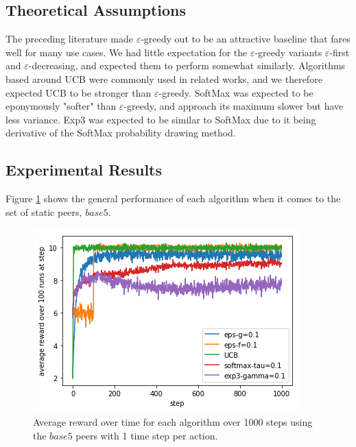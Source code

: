\documentclass{article}
\begin{document}
\subsection{Theoretical Assumptions} 
The preceding literature made $\varepsilon$-greedy out to be an attractive baseline that fares well for many use cases. We had little expectation for the $\varepsilon$-greedy 
variants $\varepsilon$-first and $\varepsilon$-decreasing, and expected them to perform somewhat similarly. Algorithms based around UCB were commonly used in related works, 
and we therefore expected UCB to be stronger than $\varepsilon$-greedy. SoftMax was expected to be eponymously "softer" than $\varepsilon$-greedy, and approach its maximum 
slower but have less variance. Exp3 was expected to be similar to SoftMax due to it being derivative of the SoftMax probability drawing method.

\subsection{Experimental Results} 

Figure \ref{fig:base5_1ts_1000step_5algos} shows the general performance of each algorithm when it comes to the set of static peers, $base5$.
\begin{figure}[h]
    \centering
    \includegraphics[width=1\linewidth]{figs/base5_1ts_1000step_5algos.png}
    \caption{Average reward over time for each algorithm over 1000 steps using the $base5$ peers with 1 time step per action.}
    \label{fig:base5_1ts_1000step_5algos}
\end{figure}
\end{document}
